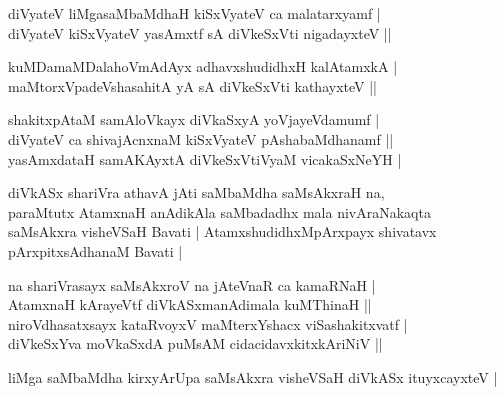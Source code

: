 \begin{entry}
\begin{shl}
diVyateV liMgasaMbaMdhaH kiSxVyateV ca malatarxyamf |\\
diVyateV kiSxVyateV yasAmxtf sA diVkeSxVti nigadayxteV ||
\end{shl}
\begin{shl}
kuMDamaMDalahoVmAdAyx adhavxshudidhxH kalAtamxkA |\\
maMtorxVpadeVshasahitA yA sA diVkeSxVti kathayxteV ||
\end{shl}
\begin{shl}
shakitxpAtaM samAloVkayx diVkaSxyA yoVjayeVdamumf |\\
diVyateV ca shivajAcnxnaM kiSxVyateV pAshabaMdhanamf ||\\
yasAmxdataH samAKAyxtA diVkeSxVtiVyaM vicakaSxNeYH |
\end{shl}
\gl{}
\info{}{}{}{}
\begin{shl}
diVkASx shariVra athavA jAti saMbaMdha saMsAkxraH na,\\
paraMtutx AtamxnaH anAdikAla saMbadadhx mala nivAraNakaqta\\
saMsAkxra visheVSaH Bavati | AtamxshudidhxMpArxpayx shivatavx pArxpitxsAdhanaM Bavati |
\end{shl}
\begin{shl}
na shariVrasayx saMsAkxroV na jAteVnaR ca kamaRNaH |\\
AtamxnaH kArayeVtf diVkASxmanAdimala kuMThinaH ||\\
niroVdhasatxsayx kataRvoyxV maMterxYshacx viSashakitxvatf |\\
diVkeSxYva moVkaSxdA puMsAM cidacidavxkitxkAriNiV ||
\end{shl}
\begin{shl}
liMga saMbaMdha kirxyArUpa saMsAkxra visheVSaH diVkASx ituyxcayxteV |\\

\end{shl}
\end{entry}
